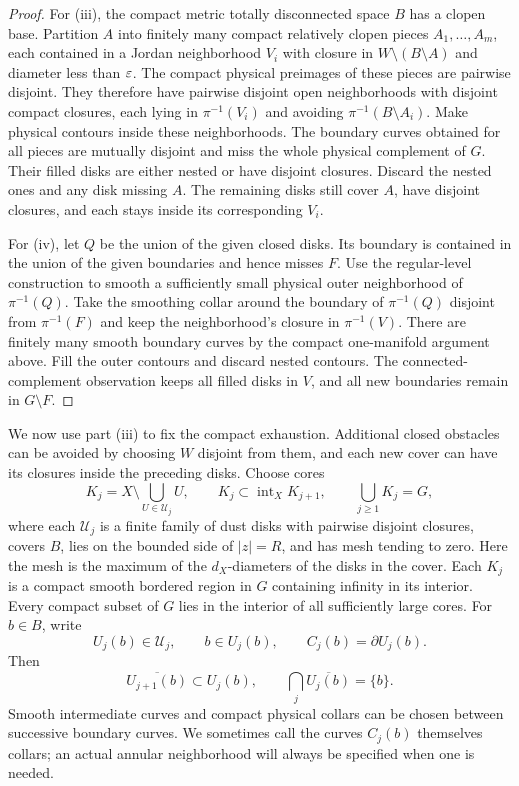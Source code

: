 \begin{proof}
For \textup{(iii)}, the compact metric totally disconnected space $B$
has a clopen base.  Partition $A$ into finitely many compact relatively
clopen pieces $A_1,\ldots,A_m$, each contained in a Jordan neighborhood
$V_i$ with closure in $W\setminus(B\setminus A)$ and diameter less
than $\varepsilon$.  The compact physical preimages of these pieces are
pairwise disjoint.  They therefore have pairwise disjoint open
neighborhoods with disjoint compact closures, each lying in
$\pi^{-1}(V_i)$ and avoiding $\pi^{-1}(B\setminus A_i)$.
Make physical contours inside these neighborhoods.  The boundary
curves obtained for all pieces are mutually disjoint and miss the
whole physical complement of $G$.  Their filled disks are either
nested or have disjoint closures.  Discard the nested ones and any
disk missing $A$.  The remaining disks still cover $A$, have disjoint
closures, and each stays inside its corresponding $V_i$.

For \textup{(iv)}, let $Q$ be the union of the given closed disks.
Its boundary is contained in the union of the given boundaries and
hence misses $F$.  Use the regular-level construction to smooth a
sufficiently small physical outer neighborhood of $\pi^{-1}(Q)$.
Take the smoothing collar around the boundary of $\pi^{-1}(Q)$
disjoint from $\pi^{-1}(F)$ and keep the neighborhood's closure in
$\pi^{-1}(V)$.  There are finitely many smooth boundary
curves by the compact one-manifold argument above.  Fill the outer
contours and discard nested contours.
The connected-complement observation keeps all filled disks in $V$,
and all new boundaries remain in $G\setminus F$.
\end{proof}

We now use part \textup{(iii)} to fix the compact exhaustion.
Additional closed obstacles can be avoided by choosing $W$ disjoint
from them, and each new cover can have its closures inside the
preceding disks.  Choose cores
\[
 K_j=X\setminus\bigcup_{U\in\mathcal U_j}U,
 \qquad K_j\subset\operatorname{int}_X K_{j+1},
 \qquad \bigcup_{j\ge1}K_j=G,
\]
where each $\mathcal U_j$ is a finite family of dust disks with
pairwise disjoint closures, covers $B$, lies on the bounded side of
$|z|=R$, and has mesh tending to zero.  Here the mesh is the maximum
of the $d_X$-diameters of the disks in the cover.  Each $K_j$ is a
compact smooth bordered region in $G$ containing infinity in its
interior.  Every compact subset of $G$ lies in the interior of all
sufficiently large cores.  For $b\in B$, write
\[
 U_j(b)\in\mathcal U_j,\qquad b\in U_j(b),
 \qquad C_j(b)=\partial U_j(b).
\]
Then
\[
 \overline{U_{j+1}(b)}\subset U_j(b),
 \qquad \bigcap_j\overline{U_j(b)}=\{b\}.
\]
Smooth intermediate curves and compact physical collars can be chosen
between successive boundary curves.  We sometimes call the curves
$C_j(b)$ themselves collars; an actual annular neighborhood will always
be specified when one is needed.

